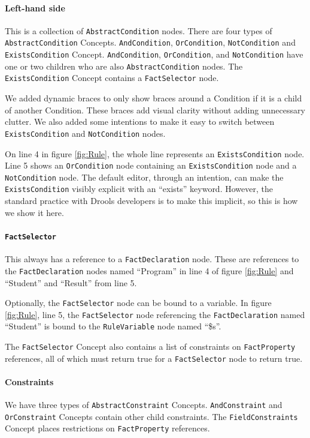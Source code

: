 \paragraph{Left-hand side} This is a collection of \texttt{AbstractCondition} nodes.
There are four types of \texttt{AbstractCondition} Concepts.
\texttt{AndCondition}, \texttt{OrCondition}, \texttt{NotCondition} and \texttt{ExistsCondition} Concept.
\texttt{AndCondition}, \texttt{OrCondition}, and \texttt{NotCondition} have one or two children who are also \texttt{AbstractCondition} nodes.
The \texttt{ExistsCondition} Concept contains a \texttt{FactSelector} node.

We added dynamic braces to only show braces around a Condition if it is a child of another Condition.
These braces add visual clarity without adding unnecessary clutter.
We also added some intentions to make it easy to switch between \texttt{ExistsCondition} and \texttt{NotCondition} nodes.

On line 4 in figure \ref{fig:Rule}, the whole line represents an \texttt{ExistsCondition} node.
Line 5 shows an \texttt{OrCondition} node containing an \texttt{ExistsCondition} node and a \texttt{NotCondition} node.
The default editor, through an intention, can make the \texttt{ExistsCondition} visibly explicit with an ``exists'' keyword.
However, the standard practice with Drools developers is to make this implicit, so this is how we show it here.

\paragraph{\texttt{FactSelector}} This always has a reference to a \texttt{FactDeclaration} node.
These are references to the \texttt{FactDeclaration} nodes named ``Program'' in line 4 of figure \ref{fig:Rule} and ``Student'' and ``Result'' from line 5.

Optionally, the \texttt{FactSelector} node can be bound to a variable.
In figure \ref{fig:Rule}, line 5, the \texttt{FactSelector} node referencing the \texttt{FactDeclaration} named ``Student'' is bound to the \texttt{RuleVariable} node named ``\$s''.

The \texttt{FactSelector} Concept also contains a list of constraints on \texttt{FactProperty} references, all of which must return true for a \texttt{FactSelector} node to return true.

\paragraph{Constraints} We have three types of \texttt{AbstractConstraint} Concepts.
\texttt{AndConstraint} and \texttt{OrConstraint} Concepts contain other child constraints.
The \texttt{FieldConstraints} Concept places restrictions on \texttt{FactProperty} references.

